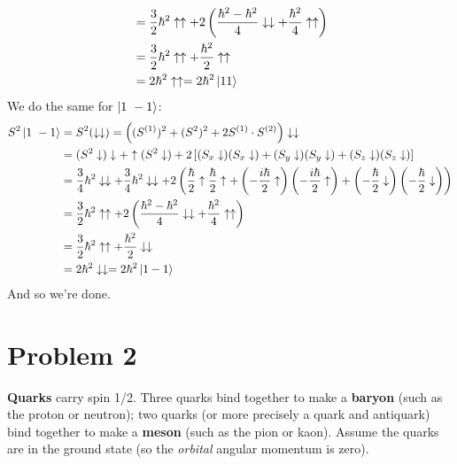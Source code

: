 \documentclass[10pt]{article}
\newcommand{\uu}{\uparrow \uparrow}
\renewcommand{\dd}{\downarrow \downarrow}
\newcommand{\ua}{\uparrow}
\newcommand{\da}{\downarrow}
\begin{document}
\begin{enumerate}[(a)]
\begin{solution}
\begin{align*}
                    &= \frac32\hbar^2\uu + 2\left(\frac{\hbar^2 - \hbar^2}{4}\dd + \frac{\hbar^2}{4}\uu\right)\\
                    & = \frac32\hbar^2\uu + \frac{\hbar^2}{2}\uu\\
                    &=  2\hbar^2\uu = 2\hbar^2\ket{1 1}
                \end{align*}
                We do the same for $\ket{1 \ -1}$:
                \begin{align*}
                    S^2\ket{1 \ -1} &= S^2(\dd) = \left((S^{(1)})^2 + (S^{2})^2 + 2S^{(1)}\cdot S^{(2)}\right)\dd \\
                    &= (S^2\da)\da + \ua(S^2\da) + 2\left[(S_x\da)(S_x\da) + (S_y\da)(S_y\da) +(S_z\da)(S_z\da)\right] \\ 
                    &= \frac34\hbar^2\dd + \frac34\hbar^2\dd + 2\left(\frac{\hbar}{2}\ua\frac{\hbar}{2}\ua + \left(-\frac{i\hbar}{2}\ua\right)\left(-\frac{i\hbar}{2}\ua\right) + \left(-\frac{\hbar}{2}\da\right)\left(-\frac{\hbar}{2}\da\right)\right) \\
                    &= \frac32\hbar^2\uu + 2\left(\frac{\hbar^2 - \hbar^2}{4}\dd + \frac{\hbar^2}{4}\uu\right)\\
                    &= \frac32\hbar^2\uu + \frac{\hbar^2}{2}\dd\\
                    &= 2\hbar^2\dd = 2\hbar^2\ket{1 -1}
                \end{align*}
                And so we're done.
        \end{solution}
    \end{enumerate}

    \pagebreak

    \section*{Problem 2}

    \textbf{Quarks} carry spin 1/2. Three quarks bind together to make a \textbf{baryon} (such as the proton or neutron); two quarks (or more precisely a quark and antiquark) bind together to make a \textbf{meson} (such as the pion or kaon). Assume the quarks are in the ground state (so the \textit{orbital} angular momentum is zero).
\end{document}
